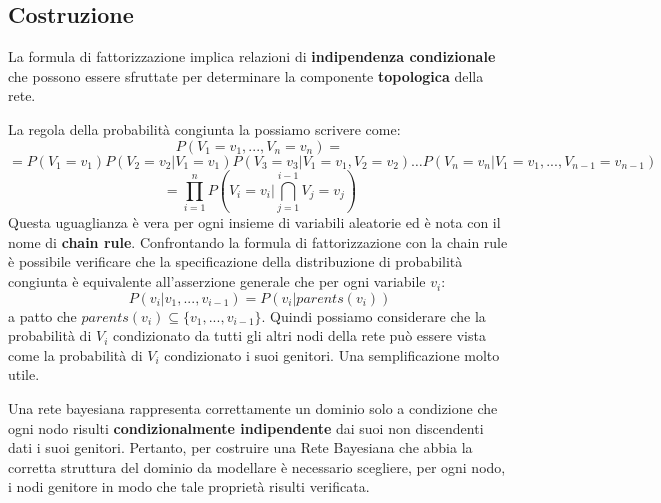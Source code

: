 \subsection{Costruzione}
La formula di fattorizzazione implica relazioni di \textbf{indipendenza condizionale}
che possono essere sfruttate per determinare la componente \textbf{topologica} della rete.

La regola della probabilità congiunta la possiamo scrivere come:
\begin{equation*}
    P(V_1= v_1,...,V_n = v_n) =
\end{equation*}
\begin{equation*}
    =P(V_1=v_1)P(V_2=v_2|V_1=v_1)P(V_3 =v_3|V_1=v_1,V_2=v_2)\dots P(V_n=v_n|V_1=v_1,...,V_{n-1}=v_{n-1})
\end{equation*}
\begin{equation*}
    =\prod_{i=1}^{n} P(V_i=v_i|\bigcap_{j=1} ^{i-1} V_j= v_j)
\end{equation*}
Questa uguaglianza è vera per ogni insieme di variabili aleatorie ed è nota con
il nome di \textbf{chain rule}. Confrontando la formula di fattorizzazione con
la chain rule è possibile verificare che la specificazione della distribuzione
di probabilità congiunta è equivalente all'asserzione generale che per ogni
variabile $v_i$:
\begin{equation}
    P(v_i|v_1,...,v_{i-1}) = P(v_i|parents(v_i))
\end{equation}
a patto che $parents(v_i) \subseteq \{v_1,...,v_{i-1}\}$. Quindi possiamo considerare
che la probabilità di $V_i$ condizionato da tutti gli altri nodi della rete può essere
vista come la probabilità di $V_i$ condizionato i suoi genitori. Una semplificazione
molto utile.

Una rete bayesiana rappresenta correttamente un dominio solo a condizione che ogni
nodo risulti \textbf{condizionalmente indipendente} dai suoi non discendenti dati i suoi
genitori. Pertanto, per costruire una Rete Bayesiana che abbia la corretta
struttura del dominio da modellare è necessario scegliere, per ogni nodo, i nodi
genitore in modo che tale proprietà risulti verificata.

